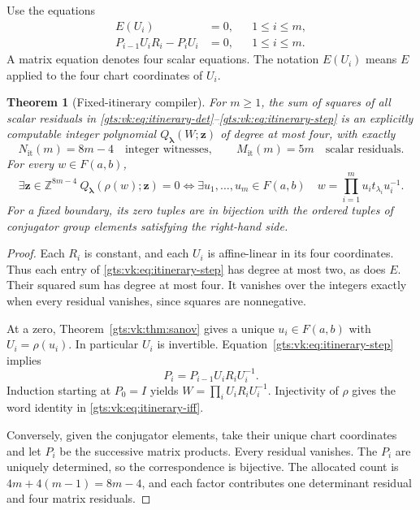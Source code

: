 \documentclass[11pt,letterpaper]{article}
\newtheorem{theorem}{Theorem}[section]
\theoremstyle{definition}
\theoremstyle{remark}
\newcommand{\Z}{\mathbb Z}
\newcommand{\F}{F(a,b)}
\begin{document}
Use the equations
\begin{align}
 E(U_i)&=0, &&1\leq i\leq m,\label{gts:vk:eq:itinerary-det}\\
 P_{i-1}U_iR_i-P_iU_i&=0, &&1\leq i\leq m.\label{gts:vk:eq:itinerary-step}
\end{align}
A matrix equation denotes four scalar equations. The notation $E(U_i)$ means $E$ applied to the four chart coordinates of $U_i$.

\begin{theorem}[Fixed-itinerary compiler]\label{gts:vk:thm:itinerary}
For $m\geq1$, the sum of squares of all scalar residuals in
\eqref{gts:vk:eq:itinerary-det}--\eqref{gts:vk:eq:itinerary-step} is an explicitly computable integer polynomial $Q_{\boldsymbol\lambda}(W;\boldsymbol z)$ of degree at most four, with exactly
\begin{equation}\label{gts:vk:eq:itinerary-counts}
 N_{\mathrm{it}}(m)=8m-4\quad\text{integer witnesses},\qquad
 M_{\mathrm{it}}(m)=5m\quad\text{scalar residuals}.
\end{equation}
For every $w\in\F$,
\begin{equation}\label{gts:vk:eq:itinerary-iff}
 \exists\boldsymbol z\in\Z^{8m-4}\ Q_{\boldsymbol\lambda}(\rho(w);\boldsymbol z)=0
 \iff
 \exists u_1,\ldots,u_m\in\F\quad
 w=\prod_{i=1}^{m}u_it_{\lambda_i}u_i^{-1}.
\end{equation}
For a fixed boundary, its zero tuples are in bijection with the ordered tuples of conjugator group elements satisfying the right-hand side.
\end{theorem}

\begin{proof}
Each $R_i$ is constant, and each $U_i$ is affine-linear in its four coordinates. Thus each entry of \eqref{gts:vk:eq:itinerary-step} has degree at most two, as does $E$. Their squared sum has degree at most four. It vanishes over the integers exactly when every residual vanishes, since squares are nonnegative.

At a zero, Theorem~\ref{gts:vk:thm:sanov} gives a unique $u_i\in\F$ with $U_i=\rho(u_i)$. In particular $U_i$ is invertible. Equation~\eqref{gts:vk:eq:itinerary-step} implies
\[
 P_i=P_{i-1}U_iR_iU_i^{-1}.
\]
Induction starting at $P_0=I$ yields
$W=\prod_iU_iR_iU_i^{-1}$.
Injectivity of $\rho$ gives the word identity in \eqref{gts:vk:eq:itinerary-iff}.

Conversely, given the conjugator elements, take their unique chart coordinates and let $P_i$ be the successive matrix products. Every residual vanishes. The $P_i$ are uniquely determined, so the correspondence is bijective. The allocated count is $4m+4(m-1)=8m-4$, and each factor contributes one determinant residual and four matrix residuals.
\end{proof}
\end{document}
